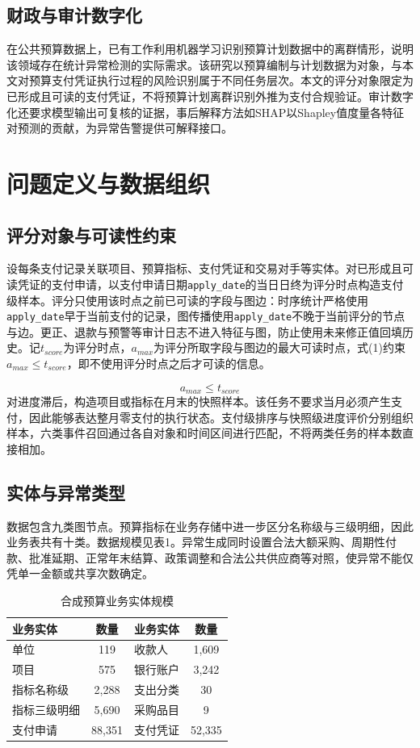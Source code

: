 \documentclass[twocolumn,11pt]{ctexart}
\begin{document}
\subsection{财政与审计数字化}
在公共预算数据上，已有工作利用机器学习识别预算计划数据中的离群情形，说明该领域存在统计异常检测的实际需求\cite{ref36}。该研究以预算编制与计划数据为对象，与本文对预算支付凭证执行过程的风险识别属于不同任务层次。本文的评分对象限定为已形成且可读的支付凭证，不将预算计划离群识别外推为支付合规验证。审计数字化还要求模型输出可复核的证据，事后解释方法如SHAP以Shapley值度量各特征对预测的贡献，为异常告警提供可解释接口\cite{ref37}。

\section{问题定义与数据组织}
\subsection{评分对象与可读性约束}
设每条支付记录关联项目、预算指标、支付凭证和交易对手等实体。对已形成且可读凭证的支付申请，以支付申请日期\texttt{apply\_date}的当日日终为评分时点构造支付级样本。评分只使用该时点之前已可读的字段与图边：时序统计严格使用\texttt{apply\_date}早于当前支付的记录，图传播使用\texttt{apply\_date}不晚于当前评分的节点与边。更正、退款与预警等审计日志不进入特征与图，防止使用未来修正值回填历史。记$t_{score}$为评分时点，$a_{max}$为评分所取字段与图边的最大可读时点，式(1)约束$a_{max}$$\le$$t_{score}$，即不使用评分时点之后才可读的信息。

\begin{equation}
a_{max} \le t_{score}
\end{equation}
对进度滞后，构造项目或指标在月末的快照样本。该任务不要求当月必须产生支付，因此能够表达整月零支付的执行状态。支付级排序与快照级进度评价分别组织样本，六类事件召回通过各自对象和时间区间进行匹配，不将两类任务的样本数直接相加。

\subsection{实体与异常类型}
数据包含九类图节点。预算指标在业务存储中进一步区分名称级与三级明细，因此业务表共有十类。数据规模见表1。异常生成同时设置合法大额采购、周期性付款、批准延期、正常年末结算、政策调整和合法公共供应商等对照，使异常不能仅凭单一金额或共享次数确定。

\begin{table}[t]
\centering\small
\caption{合成预算业务实体规模}
\begin{tabular}{lclc}
\toprule
业务实体 & 数量 & 业务实体 & 数量 \\
\midrule
单位 & 119 & 收款人 & 1,609 \\
项目 & 575 & 银行账户 & 3,242 \\
指标名称级 & 2,288 & 支出分类 & 30 \\
指标三级明细 & 5,690 & 采购品目 & 9 \\
支付申请 & 88,351 & 支付凭证 & 52,335 \\
\bottomrule
\end{tabular}
\end{table}
\end{document}
